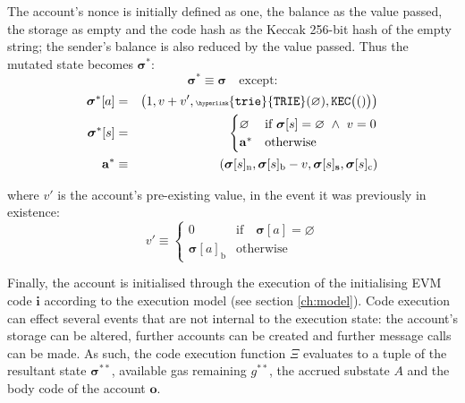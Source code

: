\documentclass[9pt,oneside]{amsart}
\begin{document}
\begin{multicols}{2}
The account's nonce is initially defined as one, the balance as the value passed, the storage as empty and the code hash as the Keccak 256-bit hash of the empty string; the sender's balance is also reduced by the value passed. Thus the mutated state becomes $\boldsymbol{\sigma}^*$:
\begin{equation}
\boldsymbol{\sigma}^* \equiv \boldsymbol{\sigma} \quad \text{except:}
\end{equation}
\begin{eqnarray}
\boldsymbol{\sigma}^*[a] &=& \big( 1, v + v', \mathtt{\tiny \hyperlink{trie}{TRIE}}(\varnothing), \mathtt{\tiny KEC}\big(()\big) \big) \\
\boldsymbol{\sigma}^*[s] &=& \begin{cases}
\varnothing & \text{if}\ \boldsymbol{\sigma}[s] = \varnothing \ \wedge\ v = 0 \\
\mathbf{a}^* & \text{otherwise}
\end{cases} \\
\mathbf{a}^* &\equiv& (\boldsymbol{\sigma}[s]_{\mathrm{n}}, \boldsymbol{\sigma}[s]_{\mathrm{b}} - v, \boldsymbol{\sigma}[s]_{\mathbf{s}}, \boldsymbol{\sigma}[s]_{\mathrm{c}})
\end{eqnarray}

where $v'$ is the account's pre-existing value, in the event it was previously in existence:
\begin{equation}
v' \equiv \begin{cases}
0 & \text{if} \quad \boldsymbol{\sigma}[a] = \varnothing\\
\boldsymbol{\sigma}[a]_{\mathrm{b}} & \text{otherwise}
\end{cases}
\end{equation}


Finally, the account is initialised through the execution of the initialising EVM code $\mathbf{i}$ according to the execution model (see section \ref{ch:model}). Code execution can effect several events that are not internal to the execution state: the account's storage can be altered, further accounts can be created and further message calls can be made. As such, the code execution function $\Xi$ evaluates to a tuple of the resultant state $\boldsymbol{\sigma}^{**}$, available gas remaining $g^{**}$, the accrued substate $A$ and the body code of the account $\mathbf{o}$.


\end{multicols}
\end{document}
